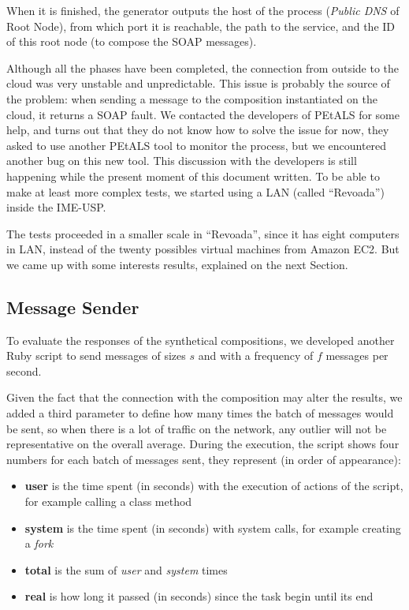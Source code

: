 When it is finished, the generator outputs the host of the process (\emph{Public DNS} of Root Node), from which port it is reachable, the path to the service, and the ID of this root node (to compose the SOAP messages).

Although all the phases have been completed, the connection from outside to the cloud was very unstable and unpredictable. This issue is probably the source of the problem: when sending a message to the composition instantiated on the cloud, it returns a SOAP fault. We contacted the developers of PEtALS for some help, and turns out that they do not know how to solve the issue for now, they asked to use another PEtALS tool to monitor the process, but we encountered another bug on this new tool. This discussion with the developers is still happening while the present moment of this document written. To be able to make at least more complex tests, we started using a LAN (called ``Revoada'') inside the IME-USP.

The tests proceeded in a smaller scale in ``Revoada'', since it has eight computers in LAN, instead of the twenty possibles virtual machines from Amazon EC2. But we came up with some interests results, explained on the next Section.


\subsection{Message Sender}

To evaluate the responses of the synthetical compositions, we developed another Ruby script to send messages of sizes $s$ and with a frequency of $f$ messages per second.

Given the fact that the connection with the composition may alter the results, we added a third parameter to define how many times the batch of messages would be sent, so when there is a lot of traffic on the network, any outlier will not be representative on the overall average. During the execution, the script shows four numbers for each batch of messages sent, they represent (in order of appearance):

\begin{itemize} 
	\item \textbf{user} is the time spent (in seconds) with the execution of actions of the script, for example calling a class method
	\item \textbf{system} is the time spent (in seconds) with system calls, for example creating a \emph{fork}
	\item \textbf{total} is the sum of \emph{user} and \emph{system} times
	\item \textbf{real} is how long it passed (in seconds) since the task begin until its end
\end{itemize}


